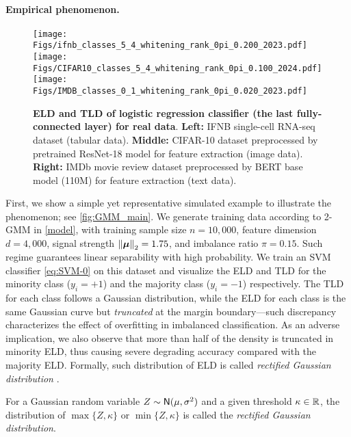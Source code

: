 \paragraph{Empirical phenomenon.} 


\begin{figure}[t]
    \centering
    \texttt{[image: Figs/ifnb\_classes\_5\_4\_whitening\_rank\_0pi\_0.200\_2023.pdf]}
    \texttt{[image: Figs/CIFAR10\_classes\_5\_4\_whitening\_rank\_0pi\_0.100\_2024.pdf]}
    \texttt{[image: Figs/IMDB\_classes\_0\_1\_whitening\_rank\_0pi\_0.020\_2023.pdf]}
    \caption{
        \textbf{ELD and TLD of logistic regression classifier (the last fully-connected layer) for
        real data}. \textbf{Left:} IFNB single-cell RNA-seq dataset (tabular data). \textbf{Middle:} CIFAR-10 dataset preprocessed by pretrained ResNet-18 model for feature extraction (image data). \textbf{Right:} IMDb movie review dataset preprocessed by BERT base model (110M) for feature extraction (text data).
        }
    \label{fig:GMM_real}
\end{figure}

First, %
we show a simple yet representative simulated example to illustrate the phenomenon; see \cref{fig:GMM_main}.
We generate training data according to 2-GMM in \cref{model}, with training sample size $n = 10,000$, feature dimension $d = 4,000$, signal strength $\left\|{\text{\boldmath $\mu$}}\right\|_2 = 1.75$, and imbalance ratio $\pi = 0.15$. Such regime guarantees linear separability with high probability. We train an SVM classifier \cref{eq:SVM-0} on this dataset and visualize the ELD and TLD for the minority class ($y_i = +1$) and the majority class ($y_i = -1$) respectively. The TLD for each class follows a Gaussian distribution, while the ELD for each class is the same Gaussian curve but \textit{truncated} at the margin boundary---such discrepancy characterizes the effect of overfitting in imbalanced classification. As an adverse implication, we also observe that more than half of the density is truncated in minority ELD, thus causing severe degrading accuracy compared with the majority ELD. 
Formally, such distribution of ELD is called \textit{rectified Gaussian distribution} \cite{rectifiedGaussian}.

\begin{defn}
    For a Gaussian random variable $Z \sim {\sf N}(\mu, \sigma^2)$ and a given threshold $\kappa \in \mathbb{R}$, the distribution of $\max\{ Z, \kappa \}$ or $\min\{ Z, \kappa \}$ is called the \emph{rectified Gaussian distribution}.
\end{defn}







